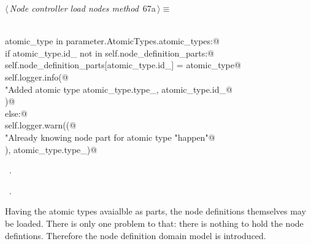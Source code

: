\documentclass[
    a4paper,      %
    10pt,         %
    openright,    %
    notitlepage,  %
    parskip=half, %
]{scrreprt}       %
\theoremstyle{definition}                    %
\begin{document}
\begin{flushleft} \small
\begin{minipage}{\linewidth}\label{scrap110}\raggedright\small
{} $\langle\,${\itshape Node controller load nodes method}\nobreak\ {\footnotesize {67a}}$\,\rangle\equiv$
\vspace{-1exm}
\begin{list}{}{} \item
\mbox{}\lstinline@@\\
\mbox{}\lstinline@for atomic_type in parameter.AtomicTypes.atomic_types:@\\
\mbox{}\lstinline@    if atomic_type.id_ not in self.node_definition_parts:@\\
\mbox{}\lstinline@        self.node_definition_parts[atomic_type.id_] = atomic_type@\\
\mbox{}\lstinline@        self.logger.info(@\\
\mbox{}\lstinline@            "Added atomic type %s: %s",@\\
\mbox{}\lstinline@            atomic_type.type_, atomic_type.id_@\\
\mbox{}\lstinline@        )@\\
\mbox{}\lstinline@    else:@\\
\mbox{}\lstinline@        self.logger.warn((@\\
\mbox{}\lstinline@            "Already knowing node part for atomic type %s. This should not"@\\
\mbox{}\lstinline@            "happen"@\\
\mbox{}\lstinline@        ), atomic_type.type_)@{\NWsep}
\end{list}
\vspace{-1.5ex}
\footnotesize
\begin{list}{}{\setlength{\itemsep}{-\parsep}\setlength{\itemindent}{-\leftmargin}}
\item \NWtxtMacroDefBy\ .
\item \NWtxtMacroRefIn\ .

\item{}
\end{list}
\end{minipage}\vspace{4ex}
\end{flushleft}
Having the atomic types avaialble as parts, the node definitions themselves may
be loaded. There is only one problem to that: there is nothing to hold the
node defintions. Therefore the node definition domain model is introduced.
\end{document}
